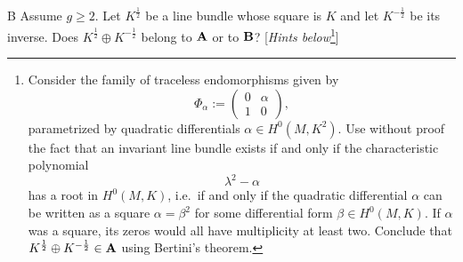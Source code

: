\documentclass[A4paper, 12pt, british, reqno]{amsart}
\newcommand{\op}{\oplus}
\newcommand{\1}{\mathbbm{1}}
\begin{document}
\begin{cexe}{B}
    Assume $g\geqslant 2$.
    Let $K^{\frac{1}{2}}$ be a line bundle whose square is $K$ and let $K^{-\frac{1}{2}}$ be its inverse.
    Does $K^{\frac{1}{2}}\op K^{-\frac{1}{2}}$ belong to $\mathbf{A}$ or to $\mathbf{B}$?
    [\textit{Hints below}\footnote{Consider the family of traceless endomorphisms given by 
    $$\Phi_{\alpha}:=\begin{pmatrix} 0 & \alpha \\ 1 & 0 \end{pmatrix},$$
	parametrized by quadratic differentials $\alpha\in H^{0}(M,K^{2})$. Use without proof the fact that an invariant line bundle exists if and only if the characteristic polynomial
	$$\lambda^{2}-\alpha$$
	has a root in $H^{0}(M,K)$, i.e.~if and only if the quadratic differential $\alpha$ can be written as a square $\alpha=\beta^{2}$ for some differential form $\beta\in H^{0}(M,K)$. If $\alpha$ was a square, its zeros would all have multiplicity at least two. Conclude that $K^{\frac{1}{2}}\op K^{-\frac{1}{2}}\in \bfA$ using Bertini's theorem.}]
\end{cexe}
\end{document}
